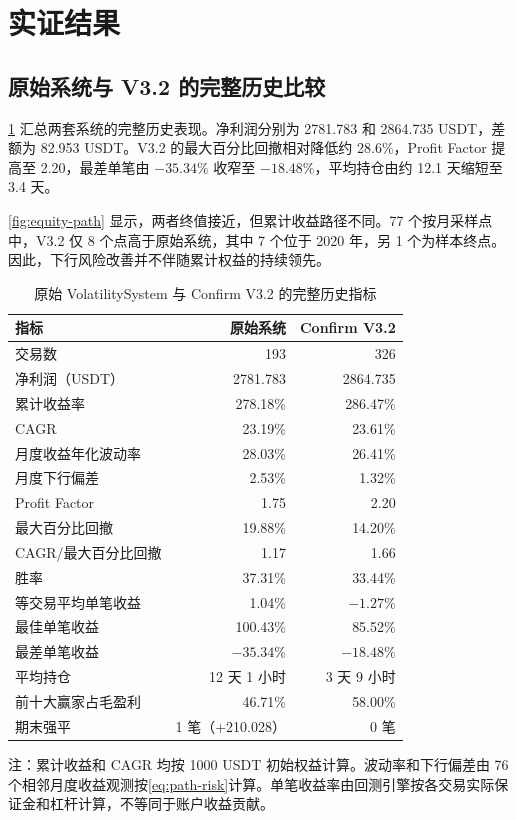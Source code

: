 \section{实证结果}

\subsection{原始系统与 V3.2 的完整历史比较}

\cref{tab:baseline-v32} 汇总两套系统的完整历史表现。净利润分别为 2781.783 和 2864.735 USDT，差额为 82.953 USDT。V3.2 的最大百分比回撤相对降低约 28.6\%，Profit Factor 提高至 2.20，最差单笔由 $-35.34\%$ 收窄至 $-18.48\%$，平均持仓由约 12.1 天缩短至 3.4 天。

\cref{fig:equity-path} 显示，两者终值接近，但累计收益路径不同。77 个按月采样点中，V3.2 仅 8 个点高于原始系统，其中 7 个位于 2020 年，另 1 个为样本终点。因此，下行风险改善并不伴随累计权益的持续领先。

\begin{table}[H]
  \centering
  \caption{原始 VolatilitySystem 与 Confirm V3.2 的完整历史指标}
  \label{tab:baseline-v32}
  \begin{threeparttable}
    \begin{tabular}{lrr}
      \toprule
      指标 & 原始系统 & Confirm V3.2\\
      \midrule
      交易数 & 193 & 326\\
      净利润（USDT） & 2781.783 & 2864.735\\
      累计收益率 & 278.18\% & 286.47\%\\
      CAGR & 23.19\% & 23.61\%\\
      月度收益年化波动率 & 28.03\% & 26.41\%\\
      月度下行偏差 & 2.53\% & 1.32\%\\
      Profit Factor & 1.75 & 2.20\\
      最大百分比回撤 & 19.88\% & 14.20\%\\
      CAGR/最大百分比回撤 & 1.17 & 1.66\\
      胜率 & 37.31\% & 33.44\%\\
      等交易平均单笔收益 & 1.04\% & $-1.27\%$\\
      最佳单笔收益 & 100.43\% & 85.52\%\\
      最差单笔收益 & $-35.34\%$ & $-18.48\%$\\
      平均持仓 & 12 天 1 小时 & 3 天 9 小时\\
      前十大赢家占毛盈利 & 46.71\% & 58.00\%\\
      期末强平 & 1 笔（+210.028） & 0 笔\\
      \bottomrule
    \end{tabular}
    \begin{tablenotes}[flushleft]\footnotesize
      \item 注：累计收益和 CAGR 均按 1000 USDT 初始权益计算。波动率和下行偏差由 76 个相邻月度收益观测按\cref{eq:path-risk}计算。单笔收益率由回测引擎按各交易实际保证金和杠杆计算，不等同于账户收益贡献。
    \end{tablenotes}
  \end{threeparttable}
\end{table}

